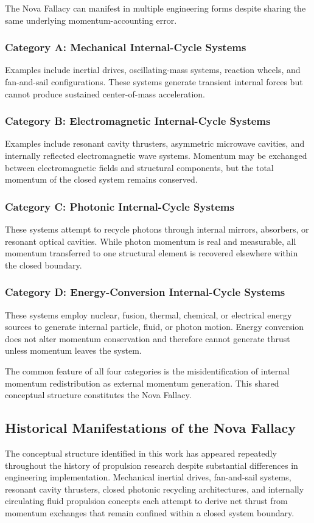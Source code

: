 \documentclass[journal,10pt,twoside]{IEEEtran}
\begin{document}
The Nova Fallacy can manifest in multiple engineering forms despite sharing the same underlying momentum-accounting error.

\subsubsection{Category A: Mechanical Internal-Cycle Systems}
Examples include inertial drives, oscillating-mass systems, reaction wheels, and fan-and-sail configurations. These systems generate transient internal forces but cannot produce sustained center-of-mass acceleration.

\subsubsection{Category B: Electromagnetic Internal-Cycle Systems}
Examples include resonant cavity thrusters, asymmetric microwave cavities, and internally reflected electromagnetic wave systems. Momentum may be exchanged between electromagnetic fields and structural components, but the total momentum of the closed system remains conserved.

\subsubsection{Category C: Photonic Internal-Cycle Systems}
These systems attempt to recycle photons through internal mirrors, absorbers, or resonant optical cavities. While photon momentum is real and measurable, all momentum transferred to one structural element is recovered elsewhere within the closed boundary.

\subsubsection{Category D: Energy-Conversion Internal-Cycle Systems}
These systems employ nuclear, fusion, thermal, chemical, or electrical energy sources to generate internal particle, fluid, or photon motion. Energy conversion does not alter momentum conservation and therefore cannot generate thrust unless momentum leaves the system.

The common feature of all four categories is the misidentification of internal momentum redistribution as external momentum generation. This shared conceptual structure constitutes the Nova Fallacy.

\subsection{Historical Manifestations of the Nova Fallacy}
The conceptual structure identified in this work has appeared repeatedly throughout the history of propulsion research despite substantial differences in engineering implementation. Mechanical inertial drives, fan-and-sail systems, resonant cavity thrusters, closed photonic recycling architectures, and internally circulating fluid propulsion concepts each attempt to derive net thrust from momentum exchanges that remain confined within a closed system boundary.
\end{document}
